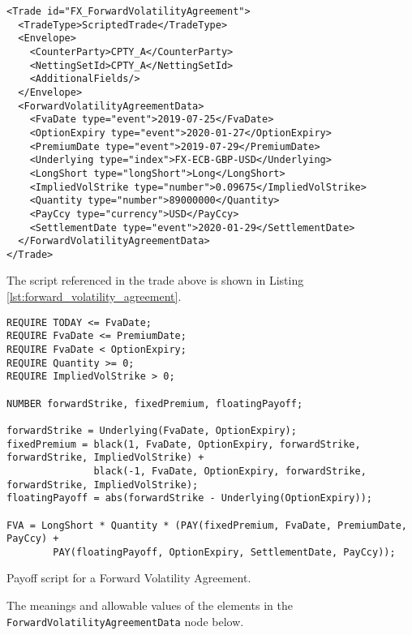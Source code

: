 \begin{verbatim} 
<Trade id="FX_ForwardVolatilityAgreement">
  <TradeType>ScriptedTrade</TradeType>
  <Envelope>
    <CounterParty>CPTY_A</CounterParty>
    <NettingSetId>CPTY_A</NettingSetId>
    <AdditionalFields/>
  </Envelope>
  <ForwardVolatilityAgreementData>
    <FvaDate type="event">2019-07-25</FvaDate>
    <OptionExpiry type="event">2020-01-27</OptionExpiry>
    <PremiumDate type="event">2019-07-29</PremiumDate>
    <Underlying type="index">FX-ECB-GBP-USD</Underlying>
    <LongShort type="longShort">Long</LongShort>
    <ImpliedVolStrike type="number">0.09675</ImpliedVolStrike>
    <Quantity type="number">89000000</Quantity>
    <PayCcy type="currency">USD</PayCcy>
    <SettlementDate type="event">2020-01-29</SettlementDate>
  </ForwardVolatilityAgreementData>
</Trade>
\end{verbatim} 
 
The script referenced in the trade above is shown in Listing \ref{lst:forward_volatility_agreement}. 
 
\begin{listing}[hbt] 
\begin{verbatim} 
REQUIRE TODAY <= FvaDate;
REQUIRE FvaDate <= PremiumDate;
REQUIRE FvaDate < OptionExpiry;
REQUIRE Quantity >= 0;
REQUIRE ImpliedVolStrike > 0;

NUMBER forwardStrike, fixedPremium, floatingPayoff;

forwardStrike = Underlying(FvaDate, OptionExpiry);
fixedPremium = black(1, FvaDate, OptionExpiry, forwardStrike, forwardStrike, ImpliedVolStrike) +
               black(-1, FvaDate, OptionExpiry, forwardStrike, forwardStrike, ImpliedVolStrike);
floatingPayoff = abs(forwardStrike - Underlying(OptionExpiry));

FVA = LongShort * Quantity * (PAY(fixedPremium, FvaDate, PremiumDate, PayCcy) +
        PAY(floatingPayoff, OptionExpiry, SettlementDate, PayCcy));
\end{verbatim} 
\caption{Payoff script for a Forward Volatility Agreement.} 
\label{lst:forward_volatility_agreement} 
\end{listing} 
 
The meanings and allowable values of the elements in the \lstinline!ForwardVolatilityAgreementData! node below. 
 
